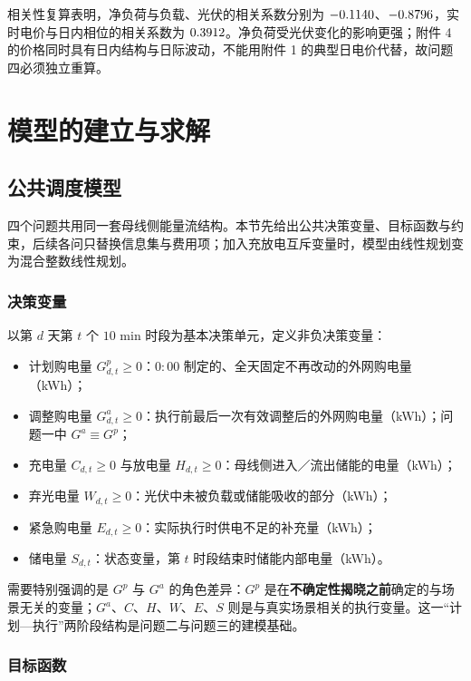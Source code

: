 相关性复算表明，净负荷与负载、光伏的相关系数分别为 $-0.1140$、$-0.8796$，实时电价与日内相位的相关系数为 $0.3912$。净负荷受光伏变化的影响更强；附件 4 的价格同时具有日内结构与日际波动，不能用附件 1 的典型日电价代替，故问题四必须独立重算。

\section{模型的建立与求解}

\subsection{公共调度模型}

四个问题共用同一套母线侧能量流结构。本节先给出公共决策变量、目标函数与约束，后续各问只替换信息集与费用项；加入充放电互斥变量时，模型由线性规划变为混合整数线性规划。

\subsubsection{决策变量}

以第 $d$ 天第 $t$ 个 $10$ min 时段为基本决策单元，定义非负决策变量：

\begin{itemize}[itemsep=1pt, topsep=2pt]
	\item 计划购电量 $G^{p}_{d,t}\ge 0$：$0{:}00$ 制定的、全天固定不再改动的外网购电量（kWh）；
	\item 调整购电量 $G^{a}_{d,t}\ge 0$：执行前最后一次有效调整后的外网购电量（kWh）；问题一中 $G^{a}\equiv G^{p}$；
	\item 充电量 $C_{d,t}\ge 0$ 与放电量 $H_{d,t}\ge 0$：母线侧进入／流出储能的电量（kWh）；
	\item 弃光电量 $W_{d,t}\ge 0$：光伏中未被负载或储能吸收的部分（kWh）；
	\item 紧急购电量 $E_{d,t}\ge 0$：实际执行时供电不足的补充量（kWh）；
	\item 储电量 $S_{d,t}$：状态变量，第 $t$ 时段结束时储能内部电量（kWh）。
\end{itemize}

需要特别强调的是 $G^{p}$ 与 $G^{a}$ 的角色差异：$G^{p}$ 是在\textbf{不确定性揭晓之前}确定的与场景无关的变量；$G^{a}$、$C$、$H$、$W$、$E$、$S$ 则是与真实场景相关的执行变量。这一“计划—执行”两阶段结构是问题二与问题三的建模基础。

\subsubsection{目标函数}

